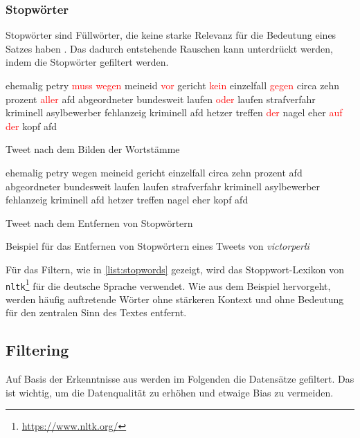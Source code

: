\subsubsection{Stopwörter}

Stopwörter sind Füllwörter, die keine starke Relevanz für die Bedeutung eines Satzes haben \autocite[4]{kowsari_text_2019}. Das dadurch entstehende Rauschen kann unterdrückt werden, indem die Stopwörter gefiltert werden.

\begin{example}[H]
    {\footnotesize
        \begin{subexample}{0.45\textwidth}
            ehemalig petry \textcolor{red}{muss wegen} meineid \textcolor{red}{vor} gericht \textcolor{red}{kein} einzelfall \textcolor{red}{gegen} circa zehn prozent \textcolor{red}{aller} afd abgeordneter bundesweit laufen \textcolor{red}{oder} laufen strafverfahr kriminell asylbewerber fehlanzeig kriminell afd hetzer treffen \textcolor{red}{der} nagel eher \textcolor{red}{auf der} kopf afd
            \caption{Tweet nach dem Bilden der Wortstämme}
        \end{subexample}\hfill
        \begin{subexample}{0.45\textwidth}
            ehemalig petry wegen meineid gericht einzelfall circa zehn prozent afd abgeordneter bundesweit laufen laufen strafverfahr kriminell asylbewerber fehlanzeig kriminell afd hetzer treffen nagel eher kopf afd
            \caption{Tweet nach dem Entfernen von Stopwörtern}
        \end{subexample}\hfill
    }
    \caption[Beispiel -- Entfernen von Stopwörtern]{Beispiel für das Entfernen von Stopwörtern eines Tweets von \textit{victorperli} \autocite{saltzer_finding_2022}} \label{list:stopwords}
\end{example}

Für das Filtern, wie in \autoref{list:stopwords} gezeigt, wird das Stoppwort-Lexikon von \texttt{nltk}\footnote{\href{https://www.nltk.org/}{https://www.nltk.org/}} für die deutsche Sprache verwendet. Wie aus dem Beispiel hervorgeht, werden häufig auftretende Wörter ohne stärkeren Kontext und ohne Bedeutung für den zentralen Sinn des Textes entfernt.

\subsection{Filtering} \label{subsec:filtering}

Auf Basis der Erkenntnisse aus  werden im Folgenden die Datensätze gefiltert. Das ist wichtig, um die Datenqualität zu erhöhen und etwaige Bias zu vermeiden.

